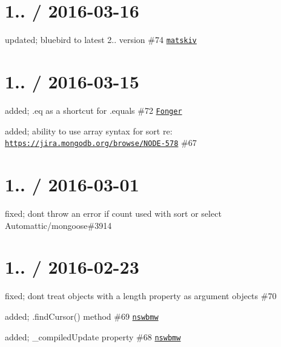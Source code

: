 \section*{1.. / 2016-\/03-\/16 }


\begin{DoxyItemize}
\item updated; bluebird to latest 2.. version \#74 \href{https://github.com/matskiv}{\tt matskiv}
\end{DoxyItemize}

\section*{1.. / 2016-\/03-\/15 }


\begin{DoxyItemize}
\item added; {\ttfamily .eq} as a shortcut for {\ttfamily .equals} \#72 \href{https://github.com/Fonger}{\tt Fonger}
\item added; ability to use array syntax for sort re\+: \href{https://jira.mongodb.org/browse/NODE-578}{\tt https\+://jira.\+mongodb.\+org/browse/\+N\+O\+D\+E-\/578} \#67
\end{DoxyItemize}

\section*{1.. / 2016-\/03-\/01 }


\begin{DoxyItemize}
\item fixed; dont throw an error if count used with sort or select Automattic/mongoose\#3914
\end{DoxyItemize}

\section*{1.. / 2016-\/02-\/23 }


\begin{DoxyItemize}
\item fixed; don\textquotesingle{}t treat objects with a length property as argument objects \#70
\item added; {\ttfamily .find\+Cursor()} method \#69 \href{https://github.com/nswbmw}{\tt nswbmw}
\item added; {\ttfamily \+\_\+compiled\+Update} property \#68 \href{https://github.com/nswbmw}{\tt nswbmw}
\end{DoxyItemize}

